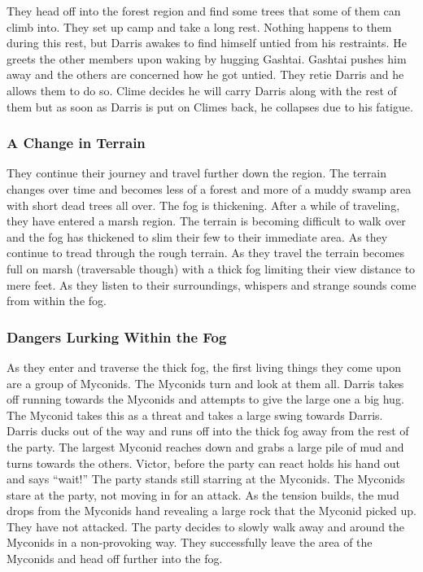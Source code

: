 They head off into the forest region and find some trees that some of them can climb into. They set up camp and take a long rest. Nothing happens to them during this rest, but Darris awakes to find himself untied from his restraints. He greets the other members upon waking by hugging Gashtai. Gashtai pushes him away and the others are concerned how he got untied. They retie Darris and he allows them to do so. Clime decides he will carry Darris along with the rest of them but as soon as Darris is put on Climes back, he collapses due to his fatigue.

\subsubsection{A Change in Terrain}

They continue their journey and travel further down the region. The terrain changes over time and becomes less of a forest and more of a muddy swamp area with short dead trees all over. The fog is thickening. After a while of traveling, they have entered a marsh region. The terrain is becoming difficult to walk over and the fog has thickened to slim their few to their immediate area. As they continue to tread through the rough terrain. As they travel the terrain becomes full on marsh (traversable though) with a thick fog limiting their view distance to mere feet. As they listen to their surroundings, whispers and strange sounds come from within the fog.

\subsubsection{Dangers Lurking Within the Fog}

As they enter and traverse the thick fog, the first living things they come upon are a group of Myconids. The Myconids turn and look at them all. Darris takes off running towards the Myconids and attempts to give the large one a big hug. The Myconid takes this as a threat and takes a large swing towards Darris. Darris ducks out of the way and runs off into the thick fog away from the rest of the party. The largest Myconid reaches down and grabs a large pile of mud and turns towards the others. Victor, before the party can react holds his hand out and says ``wait!'' The party stands still starring at the Myconids. The Myconids stare at the party, not moving in for an attack. As the tension builds, the mud drops from the Myconids hand revealing a large rock that the Myconid picked up. They have not attacked. The party decides to slowly walk away and around the Myconids in a non-provoking way. They successfully leave the area of the Myconids and head off further into the fog.

